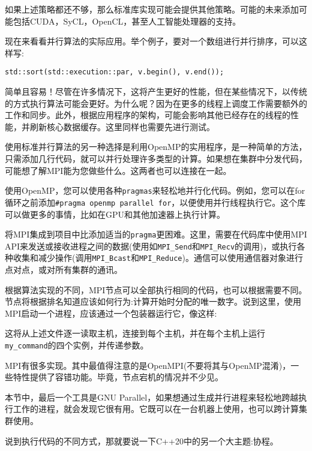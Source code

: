 如果上述策略都还不够，那么标准库实现可能会提供其他策略。可能的未来添加可能包括CUDA，SyCL，OpenCL，甚至人工智能处理器的支持。

现在来看看并行算法的实际应用。举个例子，要对一个数组进行并行排序，可以这样写:

\begin{lstlisting}[style=styleCXX]
std::sort(std::execution::par, v.begin(), v.end());
\end{lstlisting}

简单且容易！尽管在许多情况下，这将产生更好的性能，但在某些情况下，以传统的方式执行算法可能会更好。为什么呢？因为在更多的线程上调度工作需要额外的工作和同步。此外，根据应用程序的架构，可能会影响其他已经存在的线程的性能，并刷新核心数据缓存。这里同样也需要先进行测试。


使用标准并行算法的另一种选择是利用OpenMP的实用程序，是一种简单的方法，只需添加几行代码，就可以并行处理许多类型的计算。如果想在集群中分发代码，可能想了解MPI能为您做些什么。这两者也可以连接在一起。

使用OpenMP，您可以使用各种\texttt{pragmas}来轻松地并行化代码。例如，您可以在for循环之前添加\texttt{\#pragma openmp parallel for}，以便使用并行线程执行它。这个库可以做更多的事情，比如在GPU和其他加速器上执行计算。

将MPI集成到项目中比添加适当的\texttt{pragma}更困难。这里，需要在代码库中使用MPI API来发送或接收进程之间的数据(使用如\texttt{MPI\_Send}和\texttt{MPI\_Recv}的调用)，或执行各种收集和减少操作(调用\texttt{MPI\_Bcast}和\texttt{MPI\_Reduce})。通信可以使用通信器对象进行点对点，或对所有集群的通讯。

根据算法实现的不同，MPI节点可以全部执行相同的代码，也可以根据需要不同。节点将根据排名知道应该如何行为:计算开始时分配的唯一数字。说到这里，使用MPI启动一个进程，应该通过一个包装器运行它，像这样:


这将从上述文件逐一读取主机，连接到每个主机，并在每个主机上运行\texttt{my\_command}的四个实例，并传递参数。

MPI有很多实现。其中最值得注意的是OpenMPI(不要将其与OpenMP混淆)，一些特性提供了容错功能。毕竟，节点宕机的情况并不少见。

本节中，最后一个工具是GNU Parallel，如果想通过生成并行进程来轻松地跨越执行工作的进程，就会发现它很有用。它既可以在一台机器上使用，也可以跨计算集群使用。

说到执行代码的不同方式，那就要说一下C++20中的另一个大主题:协程。



















